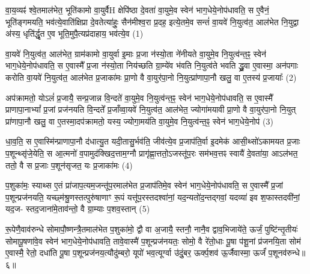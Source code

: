 \setcounter{anuvakam}{0}
वा॒य॒व्यꣴ॑ श्वे॒तमाल॑भेत॒ भूति॑कामो वा॒युर्वैH क्षेपि॑ष्ठा दे॒वता॑ वा॒युमे॒व स्वेन॑ भाग॒धेये॒नोप॑धावति॒ स ए॒वैनं॒ भूति॑ङ्गमयति॒ भव॑त्ये॒वाति॑क्षिप्रा दे॒वतेत्या॑हुः॒ सैन॑मीश्व॒रा प्र॒दह॒ इत्ये॒तमे॒व सन्तं॑ वा॒यवे॑ नि॒युत्व॑त॒ आल॑भेत नि॒युद्वा अ॑स्य॒ धृति॑र्द्धृ॒त ए॒व भूति॒मुपै॒त्यप्र॑दाहाय॒ भव॑त्ये॒व (1)

वा॒यवे॑ नि॒युत्व॑त॒ आल॑भेत॒ ग्राम॑कामो वा॒युर्वा इ॒माः प्र॒जा न॑स्यो॒ता ने॑नीयते वा॒युमे॒व नि॒युत्व॑न्त॒ꣴ॒ स्वेन॑ भाग॒धेये॒नोप॑धावति॒ स ए॒वास्मै᳚ प्र॒जा न॑स्यो॒ता निय॑च्छति ग्रा॒म्ये॑व भ॑वति नि॒युत्व॑ते भवति द्ध्रु॒वा ए॒वास्मा॒ अन॑पगाः करोति वा॒यवे॑ नि॒युत्व॑त॒ आल॑भेत प्र॒जाका॑मः प्रा॒णो वै वा॒युर॑पा॒नो नि॒युत्प्रा॑णापा॒नौ खलु॒ वा ए॒तस्य॑ प्र॒जायाः᳚ (2)

अप॑क्रामतो॒ यो\-ऽलं॑ प्र॒जायै॒ सन्प्र॒जान्न वि॒न्दते॑ वा॒युमे॒व नि॒युत्व॑न्त॒ꣴ॒ स्वेन॑ भाग॒धेये॒नोप॑धावति॒ स ए॒वास्मै᳚ प्राणापा॒ना\-भ्यां᳚ प्र॒जां प्रज॑नयति वि॒न्दते᳚ प्र॒जाँव्वा॒यवे॑ नि॒युत्व॑त॒ आल॑भेत॒ ज्योगा॑मयावी प्रा॒णो वै वा॒युर॑पा॒नो नि॒युत् प्रा॑णापा॒नौ खलु॒ वा ए॒तस्मा॒दप॑क्रामतो॒ यस्य॒ ज्योगा॒मय॑ति वा॒युमे॒व नि॒युत्व॑न्त॒ꣴ॒ स्वेन॑ भाग॒धेये॒नोप॑ (3)

धा॒व॒ति॒ स ए॒वास्मि॑न्प्राणापा॒नौ द॑धात्यु॒त यदी॒तासु॒र्भव॑ति॒ जीव॑त्ये॒व प्र॒जाप॑ति॒र्वा इ॒दमेक॑ आसी॒थ्सो॑\-ऽकामयत प्र॒जाः प॒शून्थ्सृ॑जे॒येति॒ स आ॒त्मनो॑ व॒पामुद॑क्खिद॒त्ताम॒ग्नौ प्रागृ॑ह्णा॒त्ततो॒\-ऽजस्तू॑प॒रः सम॑भव॒त्तꣴ स्वायै॑ दे॒वता॑या॒ आ\-ऽल॑भत॒ ततो॒ वै स प्र॒जाः प॒शून॑सृजत॒ यः प्र॒जाका॑मः (4)

प॒शुका॑मः॒ स्याथ्स ए॒तं प्रा॑जाप॒त्यम॒जन्तू॑प॒रमाल॑भेत प्र॒जाप॑तिमे॒व स्वेन॑ भाग॒धेये॒नोप॑धावति॒ स ए॒वास्मै᳚ प्र॒जां प॒शून्प्रज॑नयति॒ यच्छ्म॑श्रु॒णस्तत्पुरु॑षाणाꣳ रू॒पं यत्तू॑प॒रस्तदश्वा॑नां॒ यद॒न्यतो॑द॒न्तद्गवां॒ यदव्या॑ इव श॒फास्तदवी॑नां॒ यद॒ज- स्तद॒जाना॑मे॒ताव॑न्तो॒ वै ग्रा॒म्याः प॒शव॒स्तान् (5)

रू॒पेणै॒वाव॑रुन्धे सोमापौ॒ष्णन्त्रै॒तमाल॑भेत प॒शुका॑मो॒ द्वौ वा अ॒जायै॒ स्तनौ॒ नानै॒व द्वाव॒भिजाये॑ते॒ ऊर्जं॒ पुष्टि॑न्तृ॒तीयः॑ सोमापू॒षणा॑वे॒व स्वेन॑ भाग॒धेये॒नोप॑धावति॒ तावे॒वास्मै॑ प॒शून्प्रज॑नयतः॒ सोमो॒ वै रे॑तो॒धाः पू॒षा प॑शू॒नां प्र॑जनयि॒ता सोम॑ ए॒वास्मै॒ रेतो॒ दधा॑ति पू॒षा प॒शून्प्रज॑नय॒त्यौदु॑म्बरो॒ यूपो॑ भव॒त्यूर्ग्वा उ॑दुं॒बर॒ ऊर्क्प॒शव॑ ऊ॒र्जैवास्मा॒ ऊर्जं॑ प॒शूनव॑रुन्धे॥६॥

{\anuvakamend{भव॑त्ये॒व प्र॒जाया॑ आ॒मय॑ति वा॒युमे॒व नि॒युत्व॑न्त॒ꣴ॒ स्वेन॑ भाग॒धेये॒नोप॑ प्र॒जाका॑म॒स्तान् यूप॒स्त्रयो॑दश च।\scriptsize  (1)]}}

